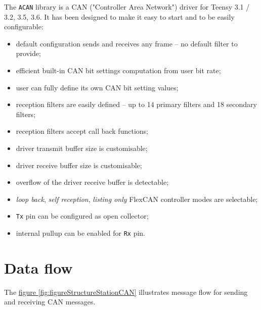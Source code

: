\documentclass[10pt, a4paper, obeyspaces, openany]{extarticle}
\newcommand\refFigure[2]{\hyperref[fig:#2]{figure \ref*{fig:#2}{\ifthenelse{\equal{#1}{}}{}{.#1}}}}
\begin{document}
The \texttt{ACAN} library is a CAN ("Controller Area Network") driver for Teensy 3.1 / 3.2, 3.5, 3.6. It has been designed to make it easy to start and to be easily configurable:
\begin{itemize}
  \item default configuration sends and receives any frame -- no default filter to provide;
  \item efficient built-in CAN bit settings computation from user bit rate;
  \item user can fully define its own CAN bit setting values;
  \item reception filters are easily defined -- up to 14 primary filters and 18 secondary filters;
  \item reception filters accept call back functions;
  \item driver transmit buffer size is customisable;
  \item driver receive buffer size is customisable;
  \item overflow of the driver receive buffer is detectable;
  \item \emph{loop back}, \emph{self reception}, \emph{listing only} FlexCAN controller modes are selectable;
  \item \texttt{Tx} pin can be configured as open collector;
  \item internal pullup can be enabled for \texttt{Rx} pin.
\end{itemize}



\section{Data flow}

The \refFigure{}{figureStructureStationCAN} illustrates message flow for sending and receiving CAN messages.
\end{document}

